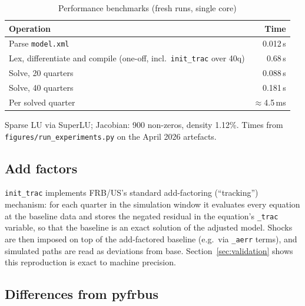 \begin{table}[htbp]
\centering
\caption{Performance benchmarks (fresh runs, single core)}
\label{tab:perf}
\begin{tabular}{lr}
\toprule
Operation & Time \\
\midrule
Parse \texttt{model.xml} & 0.012\,s \\
Lex, differentiate and compile (one-off, incl.\ \texttt{init\_trac} over 40q) & 0.68\,s \\
Solve, 20 quarters & 0.088\,s \\
Solve, 40 quarters & 0.181\,s \\
Per solved quarter & $\approx$4.5\,ms \\
\bottomrule
\end{tabular}

\medskip
\parbox{0.8\textwidth}{\footnotesize Sparse LU via SuperLU; Jacobian: 900 non-zeros, density 1.12\%. Times from \texttt{figures/run\_experiments.py} on the April 2026 artefacts.}
\end{table}

\subsection{Add factors}

\texttt{init\_trac} implements FRB/US's standard add-factoring (``tracking'') mechanism: for each quarter in the simulation window it evaluates every equation at the baseline data and stores the negated residual in the equation's \texttt{\_trac} variable, so that the baseline is an exact solution of the adjusted model. Shocks are then imposed on top of the add-factored baseline (e.g.\ via \texttt{\_aerr} terms), and simulated paths are read as deviations from base. Section~\ref{sec:validation} shows this reproduction is exact to machine precision.

\subsection{Differences from pyfrbus}

